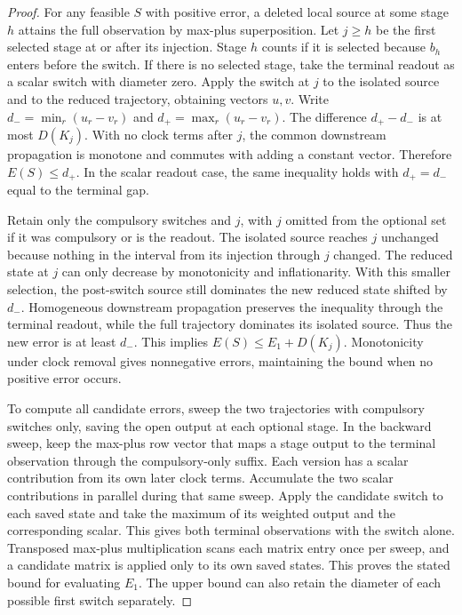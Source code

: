 \documentclass[11pt,letterpaper]{article}
\begin{document}
\begin{proof}
For any feasible $S$ with positive error, a deleted local source at some stage $h$ attains the full observation by max-plus superposition. Let $j\ge h$ be the first selected stage at or after its injection. Stage $h$ counts if it is selected because $b_h$ enters before the switch. If there is no selected stage, take the terminal readout as a scalar switch with diameter zero. Apply the switch at $j$ to the isolated source and to the reduced trajectory, obtaining vectors $u,v$. Write $d_- = \min_r(u_r-v_r)$ and $d_+ = \max_r(u_r-v_r)$. The difference $d_+-d_-$ is at most $D(K_j)$. With no clock terms after $j$, the common downstream propagation is monotone and commutes with adding a constant vector. Therefore $E(S)\le d_+$. In the scalar readout case, the same inequality holds with $d_+=d_-$ equal to the terminal gap.

Retain only the compulsory switches and $j$, with $j$ omitted from the optional set if it was compulsory or is the readout. The isolated source reaches $j$ unchanged because nothing in the interval from its injection through $j$ changed. The reduced state at $j$ can only decrease by monotonicity and inflationarity. With this smaller selection, the post-switch source still dominates the new reduced state shifted by $d_-$. Homogeneous downstream propagation preserves the inequality through the terminal readout, while the full trajectory dominates its isolated source. Thus the new error is at least $d_-$. This implies $E(S)\le E_1+D(K_j)$. Monotonicity under clock removal gives nonnegative errors, maintaining the bound when no positive error occurs.

To compute all candidate errors, sweep the two trajectories with compulsory switches only, saving the open output at each optional stage. In the backward sweep, keep the max-plus row vector that maps a stage output to the terminal observation through the compulsory-only suffix. Each version has a scalar contribution from its own later clock terms. Accumulate the two scalar contributions in parallel during that same sweep. Apply the candidate switch to each saved state and take the maximum of its weighted output and the corresponding scalar. This gives both terminal observations with the switch alone. Transposed max-plus multiplication scans each matrix entry once per sweep, and a candidate matrix is applied only to its own saved states. This proves the stated bound for evaluating $E_1$. The upper bound can also retain the diameter of each possible first switch separately.
\end{proof}
\end{document}
